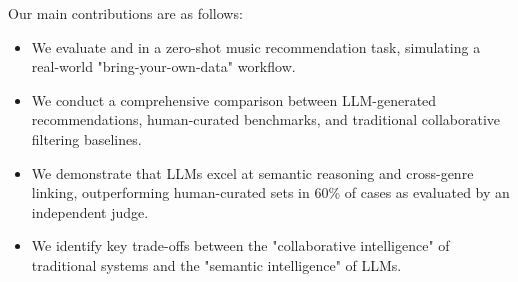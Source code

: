 Our main contributions are as follows:
\begin{itemize}[leftmargin=*,itemsep=0pt,topsep=0pt]
    \item We evaluate \claudesonnet and \gptfour in a zero-shot music recommendation task, simulating a real-world "bring-your-own-data" workflow.
    \item We conduct a comprehensive comparison between LLM-generated recommendations, human-curated benchmarks, and traditional collaborative filtering baselines.
    \item We demonstrate that LLMs excel at semantic reasoning and cross-genre linking, outperforming human-curated sets in 60\% of cases as evaluated by an independent judge.
    \item We identify key trade-offs between the "collaborative intelligence" of traditional systems and the "semantic intelligence" of LLMs.
\end{itemize}
